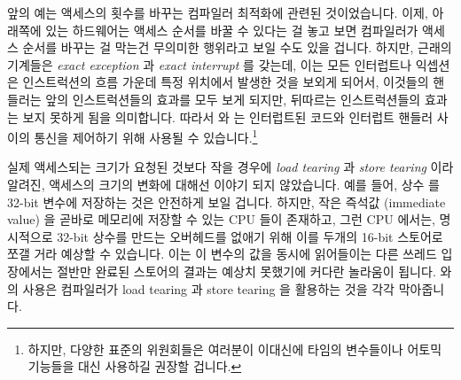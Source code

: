 앞의 예는 액세스의 횟수를 바꾸는 컴파일러 최적화에 관련된 것이었습니다.
이제, 아래쪽에 있는 하드웨어는 액세스 순서를 바꿀 수 있다는 걸 놓고 보면
컴파일러가 액세스 순서를 바꾸는 걸 막는건 무의미한 행위라고 보일 수도 있을
겁니다.
하지만, 근래의 기계들은 \emph{exact exception} 과 \emph{exact interrupt} 를
갖는데, 이는 모든 인터럽트나 익셉션은 인스트럭션의 흐름 가운데 특정 위치에서
발생한 것을 보외게 되어서, 이것들의 핸들러는 앞의 인스트럭션들의 효과를 모두
보게 되지만, 뒤따르는 인스트럭션들의 효과는 보지 못하게 됨을 의미합니다.
따라서  와  는 인터럽트된 코드와 인터럽트
핸들러 사이의 통신을 제어하기 위해 사용될 수 있습니다.\footnote{
	하지만, 다양한 표준의 위원회들은 여러분이 이대신에 
	타임의 변수들이나 어토믹 기능들을 대신 사용하길 권장할 겁니다.}

실제 액세스되는 크기가 요청된 것보다 작을 경우에 \emph{load tearing} 과
\emph{store tearing} 이라 알려진, 액세스의 크기의 변화에 대해선 이야기 되지
않았습니다.
예를 들어, 상수  를 32-bit 변수에 저장하는 것은 안전하게 보일
겁니다.
하지만, 작은 즉석값 (immediate value) 을 곧바로 메모리에 저장할 수 있는 CPU
들이 존재하고, 그런 CPU 에서는, 명시적으로 32-bit 상수를 만드는 오버헤드를
없애기 위해 이를 두개의 16-bit 스토어로 쪼갤 거라 예상할 수 있습니다.
이는 이 변수의 값을 동시에 읽어들이는 다른 쓰레드 입장에서는 절반만 완료된
스토어의 결과는 예상치 못했기에 커다란 놀라움이 됩니다.
 와  의 사용은 컴파일러가 load tearing 과
store tearing 을 활용하는 것을 각각 막아줍니다.


